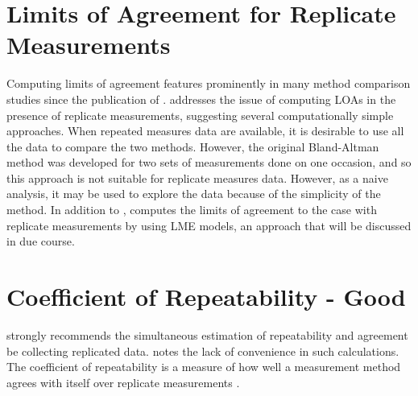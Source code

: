 \documentclass[12pt, a4paper]{report}
\theoremstyle{plain}
\theoremstyle{definition}
\theoremstyle{remark}
\begin{document}
	
\section{Limits of Agreement for Replicate Measurements}

Computing limits of agreement features prominently in many method comparison studies since the publication of \citet{BA86}.
\citet{BA99} addresses the issue of computing LOAs in the presence of replicate measurements, suggesting several computationally simple approaches. When repeated measures data are available, it is desirable to use
all the data to compare the two methods. However, the original Bland-Altman method was developed for two sets of measurements done on one occasion, and so this approach is not suitable for replicate measures data. However, as a naive analysis, it may be used to explore the data because of the simplicity of the method.
In addition to \citet{BA99}, \citet{BXC2008} computes the limits of agreement to the case with replicate measurements by using LME models, an approach that will be discussed in due course.




\section{Coefficient of Repeatability - Good}


\citet{BA99} strongly recommends the simultaneous estimation of repeatability and agreement be collecting replicated data. \citet{ARoy2009} notes the lack of convenience in such calculations.
	The coefficient of repeatability is a measure of how well a
	measurement method agrees with itself over replicate measurements
	\citep{BA99}. 
	
\end{document}
